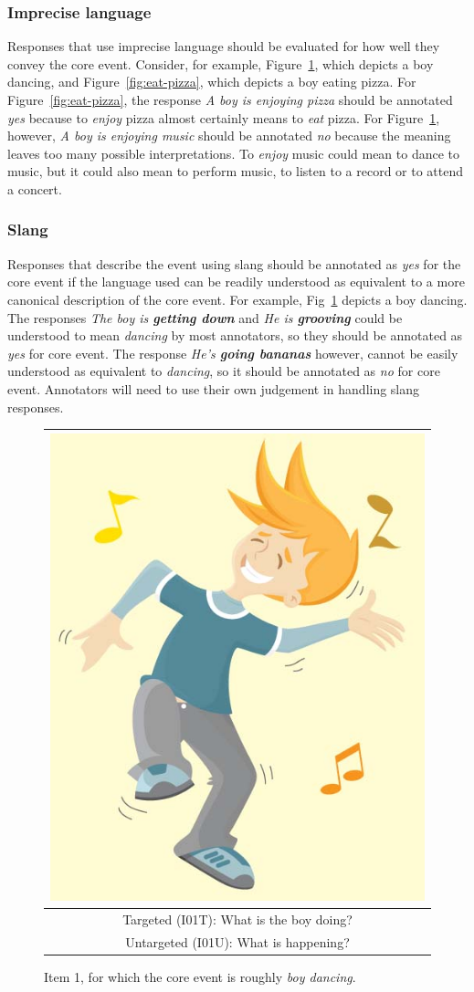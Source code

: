 \documentclass[12pt,notitlepage]{article}
\begin{document}
\subsubsection{Imprecise language} Responses that use imprecise language should be evaluated for how well they convey the core event. Consider, for example, Figure~\ref{fig:dance}, which depicts a boy dancing, and Figure~\ref{fig:eat-pizza}, which depicts a boy eating pizza. For Figure~\ref{fig:eat-pizza}, the response \textit{A boy is enjoying pizza} should be annotated \textit{yes} because to \textit{enjoy} pizza almost certainly means to \textit{eat} pizza. For Figure~\ref{fig:dance}, however, \textit{A boy is enjoying music} should be annotated \textit{no} because the meaning leaves too many possible interpretations. To \textit{enjoy} music could mean to dance to music, but it could also mean to perform music, to listen to a record or to attend a concert.

\subsubsection{Slang} Responses that describe the event using slang should be annotated as \textit{yes} for the core event if the language used can be readily understood as equivalent to a more canonical description of the core event. For example, Fig~\ref{fig:dance} depicts a boy dancing. The responses \textit{The boy is \textbf{getting down}} and \textit{He is \textbf{grooving}} could be understood to mean \textit{dancing} by most annotators, so they should be annotated as \textit{yes} for core event. The response \textit{He's \textbf{going bananas}} however, cannot be easily understood as equivalent to \textit{dancing}, so it should be annotated as \textit{no} for core event. Annotators will need to use their own judgement in handling slang responses.

\begin{figure}[h]
\begin{center}
\begin{tabular}{|c|}
\hline
\includegraphics[width=0.4\columnwidth,trim=0 0 0 -3]{../figures/I01.jpg}\\
\hline
Targeted (I01T): What is the boy doing?\\
\hline
Untargeted (I01U): What is happening? \\
\hline
\end{tabular}
\end{center}
\caption{Item 1, for which the core event is roughly \textit{boy dancing}.}
\label{fig:dance}
\end{figure}
\end{document}
